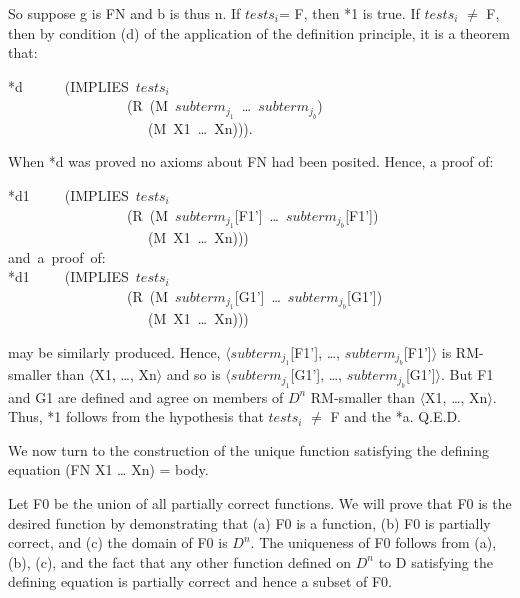 \documentclass[11pt]{book}
\newenvironment{pubasis}{\begin{flushleft}\ttfamily\small}{\normalsize\rmfamily\end{flushleft}}
\begin{document}
So suppose g is FN and b is thus n.
If $tests_{i}$= F, then *1 is true.  If $tests_{i}$ $\neq$ F, then
by condition (d) of the application of the definition principle,
it is a theorem that:
\begin{pubasis}
*d~~~~~~(IMPLIES~$tests_{i}$\\
~~~~~~~~~~~~~~~~~(R~(M~$subterm_{j_{1}}$~\ldots{}~$subterm_{j_{b}}$)\\
~~~~~~~~~~~~~~~~~~~~(M~X1~\ldots{}~Xn))).\\
\end{pubasis}
When *d was proved no axioms about FN had been posited.  Hence, a proof
of:
\begin{pubasis}
*d1~~~~~(IMPLIES~$tests_{i}$\\
~~~~~~~~~~~~~~~~~(R~(M~$subterm_{j_{1}}$[F1']~\ldots{}~$subterm_{j_{b}}$[F1'])\\
~~~~~~~~~~~~~~~~~~~~(M~X1~\ldots{}~Xn)))\\

and~a~proof~of:\\

*d1~~~~~(IMPLIES~$tests_{i}$\\
~~~~~~~~~~~~~~~~~(R~(M~$subterm_{j_{1}}$[G1']~\ldots{}~$subterm_{j_{b}}$[G1'])\\
~~~~~~~~~~~~~~~~~~~~(M~X1~\ldots{}~Xn)))\\
\end{pubasis}
may be similarly produced.  Hence,
$\langle subterm_{j_{1}}$[F1'], \ldots{}, $subterm_{j_{b}}$[F1']$\rangle$
is RM-smaller than $\langle$X1, \ldots{}, Xn$\rangle$ and so is
$\langle subterm_{j_{1}}$[G1'], \ldots{}, $subterm_{j_{b}}$[G1']$\rangle$.
But F1 and G1 are defined and agree on members of $D^{n}$ RM-smaller
than $\langle$X1, \ldots{}, Xn$\rangle$.  Thus, *1 follows from the hypothesis that
$tests_{i}$ $\neq$ F and the *a.  Q.E.D.

We now turn to the construction of the unique function satisfying
the defining equation (FN X1 \ldots{} Xn) = body.

Let F0 be the union of all partially correct functions.  We will prove
that F0 is the desired function by demonstrating that (a) F0 is a function,
(b) F0 is partially correct, and (c) the domain of F0 is $D^{n}$.
The uniqueness of F0 follows from (a), (b), (c), and the fact
that any other function defined on $D^{n}$ to D satisfying the defining
equation is partially correct and hence a subset of F0.
\end{document}
